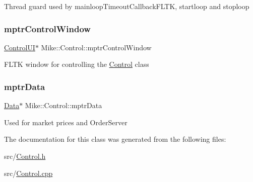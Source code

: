 \textquotesingle{}Thread guard\textquotesingle{} used by mainloop\+Timeout\+Callback\+F\+L\+TK, startloop and stoploop \mbox{\label{class_mike_1_1_control_ae6eb65158d5ab90cebb53cb46abf3d3c}} 
\subsubsection{\texorpdfstring{mptr\+Control\+Window}{mptrControlWindow}}
{\footnotesize\ttfamily \hyperlink{class_mike_1_1_control_u_i}{Control\+UI}$\ast$ Mike\+::\+Control\+::mptr\+Control\+Window\hspace{0.3cm}{\ttfamily [private]}}

F\+L\+TK window for controlling the \hyperlink{class_mike_1_1_control}{Control} class \mbox{\label{class_mike_1_1_control_ad372b18cce9cd2fbd276df12bb4e886c}} 
\subsubsection{\texorpdfstring{mptr\+Data}{mptrData}}
{\footnotesize\ttfamily \hyperlink{class_mike_1_1_data}{Data}$\ast$ Mike\+::\+Control\+::mptr\+Data\hspace{0.3cm}{\ttfamily [private]}}

Used for market prices and Order\+Server 

The documentation for this class was generated from the following files\+:\begin{DoxyCompactItemize}
\item 
src/\hyperlink{_control_8h}{Control.\+h}\item 
src/\hyperlink{_control_8cpp}{Control.\+cpp}\end{DoxyCompactItemize}
